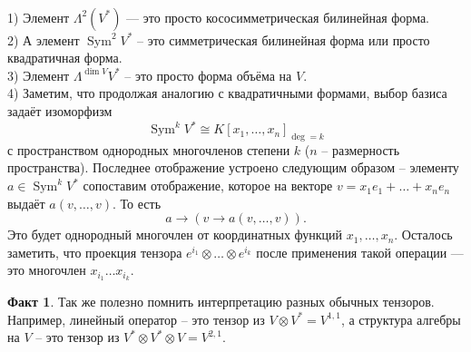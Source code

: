 \documentclass[10pt,a4paper,oneside]{book}
\theoremstyle{definition}
\newtheorem*{fact}{Факт}
\newcommand{\Sym}{\operatorname{Sym}}
\def\exm{\noindent {\bf Примеры:}}
\def\fct{\begin{fact}}
\def\efct{\end{fact}}
\begin{document}
\exm \\
1) Элемент $\Lambda^2(V^*)$ --- это просто кососимметрическая билинейная форма.\\
2) А элемент $\Sym^2 V^*$ -- это симметрическая билинейная форма или просто квадратичная форма.\\
3) Элемент $\Lambda^{\dim V} V^*$ -- это просто форма объёма на $V$.\\
4) Заметим, что продолжая аналогию с квадратичными формами, выбор базиса задаёт изоморфизм 
$$\Sym^k V^* \cong K[x_1,\dots, x_n]_{\deg =k}$$
с пространством однородных многочленов степени $k$ ($n$ -- размерность пространства). Последнее отображение устроено следующим образом -- элементу $a \in \Sym^k V^* $ сопоставим отображение, которое на векторе $v=x_1e_1+\dots+x_ne_n $ выдаёт $a(v,\dots,v)$. То есть 
$$a \to (v \to a(v,\dots,v)).$$
 Это будет однородный многочлен от координатных функций $x_1, \dots, x_n$. Осталось заметить, что проекция тензора $e^{i_1}\otimes \dots \otimes e^{i_k}$ после применения такой операции --- это многочлен $x_{i_1}\dots x_{i_k}$.

\fct Так же полезно помнить интерпретацию разных обычных тензоров. Например, линейный оператор -- это тензор из $V \otimes V^* = V^{1,1}$, а структура алгебры  на $V$ -- это тензор из $V^*\otimes V^* \otimes V=V^{2,1}$.  
\efct
\end{document}
